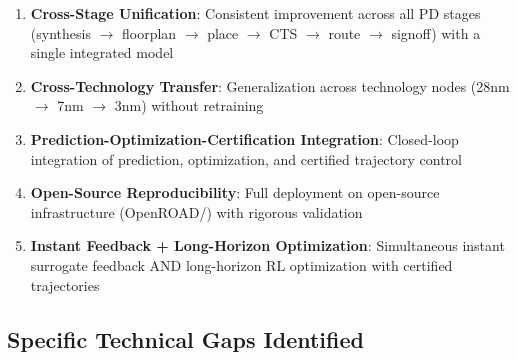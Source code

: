 \documentclass[10pt,conference]{IEEEtran}
\newcommand{\ORFS}{\text{ORFS}}
\begin{document}
\begin{enumerate}
    \item \textbf{Cross-Stage Unification}: Consistent improvement across all PD stages (synthesis $\rightarrow$ floorplan $\rightarrow$ place $\rightarrow$ CTS $\rightarrow$ route $\rightarrow$ signoff) with a single integrated model
    \item \textbf{Cross-Technology Transfer}: Generalization across technology nodes (28nm $\rightarrow$ 7nm $\rightarrow$ 3nm) without retraining
    \item \textbf{Prediction-Optimization-Certification Integration}: Closed-loop integration of prediction, optimization, and certified trajectory control
    \item \textbf{Open-Source Reproducibility}: Full deployment on open-source infrastructure (OpenROAD/\ORFS{}) with rigorous validation
    \item \textbf{Instant Feedback + Long-Horizon Optimization}: Simultaneous instant surrogate feedback AND long-horizon RL optimization with certified trajectories
\end{enumerate}

\subsection{Specific Technical Gaps Identified}
\end{document}
